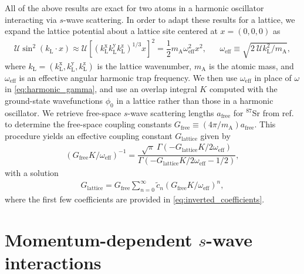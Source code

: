 \documentclass[preprint,showkeys,nofootinbib]{revtex4-1}
\renewcommand{\t}{\text} %
\newcommand{\f}{\dfrac} %
\newcommand{\p}[1]{\left(#1\right)} %
\renewcommand{\sp}[1]{\left[#1\right]} %
\newcommand{\x}{\text{x}}
\newcommand{\y}{\text{y}}
\newcommand{\z}{\text{z}}
\newcommand{\U}{\mathcal{U}}
\newcommand{\1}{\mathds{1}}
\newcommand{\mA}{m_{\text{A}}} %
\begin{document}
All of the above results are exact for two atoms in a harmonic
oscillator interacting via $s$-wave scattering.  In order to adapt
these results for a lattice, we expand the lattice potential about a
lattice site centered at $x=(0,0,0)$ as
\begin{align}
  \U\sin^2\p{k_{\t{L}} \cdot x}
  \approx \U \sp{\p{k_{\t{L}}^\x k_{\t{L}}^\y k_{\t{L}}^\z}^{1/3} x}^2
  = \f12 \mA \omega_{\t{eff}}^2 x^2,
  &&
  \omega_{\t{eff}} \equiv \sqrt{2~ \U k_{\t{L}}^2 / \mA},
\end{align}
where $k_{\t{L}}=\p{k_{\t{L}}^\x,k_{\t{L}}^\y,k_{\t{L}}^\z}$ is the
lattice wavenumber, $\mA$ is the atomic mass, and $\omega_{\t{eff}}$
is an effective angular harmonic trap frequency.  We then use
$\omega_{\t{eff}}$ in place of $\omega$ in \eqref{eq:harmonic_gamma},
and use an overlap integral $K$ computed with the ground-state
wavefunctions $\phi_0$ in a lattice rather than those in a harmonic
oscillator.  We retrieve free-space $s$-wave scattering lengths
$a_{\t{free}}$ for ${}^{87}$Sr from ref.~\cite{zhang2014spectroscopic}
to determine the free-space coupling constants
$G_{\t{free}} \equiv \p{4\pi/\mA} a_{\t{free}}$.  This procedure
yields an effective coupling constant $G_{\t{lattice}}$ given by
\begin{align}
  \p{G_{\t{free}} K/\omega_{\t{eff}}}^{-1}
  = \f{\sqrt{\pi}~ \Gamma\p{-G_{\t{lattice}}K/2\omega_{\t{eff}}}}
  {\Gamma\p{-G_{\t{lattice}}K/2\omega_{\t{eff}}-1/2}},
\end{align}
with a solution
\begin{align}
  G_{\t{lattice}} = G_{\t{free}}
  \sum_{n=0}^\infty \tilde c_n \p{G_{\t{free}}K/\omega_{\t{eff}}}^n,
\end{align}
where the first few coefficients are provided in
\eqref{eq:inverted_coefficients}.


\section{Momentum-dependent $s$-wave interactions}
\label{sec:momentum_dependence}
\end{document}
